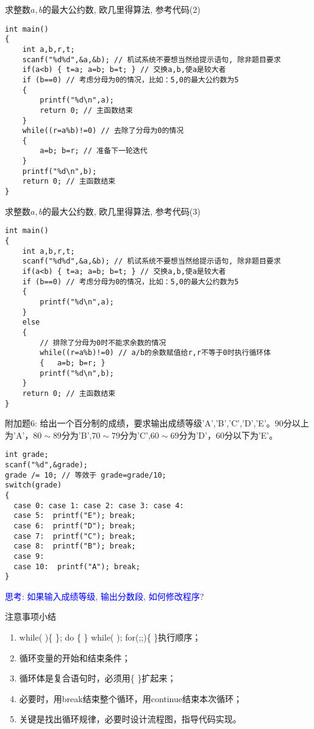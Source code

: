 \begin{frame}{求整数$a,b$的最大公约数, 欧几里得算法, 参考代码(2)}
\begin{lstlisting}
int main()
{
	int a,b,r,t;
	scanf("%d%d",&a,&b); // 机试系统不要想当然给提示语句, 除非题目要求
	if(a<b) { t=a; a=b; b=t; } // 交换a,b,使a是较大者
	if (b==0) // 考虑分母为0的情况，比如：5,0的最大公约数为5 
	{
		printf("%d\n",a);
		return 0; // 主函数结束
	}
	while((r=a%b)!=0) // 去除了分母为0的情况
	{
		a=b; b=r; // 准备下一轮迭代   
	}
	printf("%d\n",b);
	return 0; // 主函数结束
}	
\end{lstlisting}
\end{frame}

\begin{frame}{求整数$a,b$的最大公约数, 欧几里得算法, 参考代码(3)}
\begin{lstlisting}
int main()
{
	int a,b,r,t;
	scanf("%d%d",&a,&b); // 机试系统不要想当然给提示语句, 除非题目要求
	if(a<b) { t=a; a=b; b=t; } // 交换a,b,使a是较大者
	if (b==0) // 考虑分母为0的情况，比如：5,0的最大公约数为5 
	{
		printf("%d\n",a);
	}
	else
	{
		// 排除了分母为0时不能求余数的情况 
		while((r=a%b)!=0) // a/b的余数赋值给r,r不等于0时执行循环体
		{	a=b; b=r; }
		printf("%d\n",b);
	}
	return 0; // 主函数结束
}	
\end{lstlisting}
\end{frame}

\begin{frame}
附加题6: 给出一个百分制的成绩，要求输出成绩等级'A','B','C','D','E'。90分以上为'A'，$80\sim 89$分为'B',$70\sim 79$分为'C',$60\sim 69$分为'D'，60分以下为'E'。
\begin{lstlisting}
int grade;
scanf("%d",&grade);
grade /= 10; // 等效于 grade=grade/10;
switch(grade)
{
  case 0: case 1: case 2: case 3: case 4: 
  case 5:  printf("E"); break;
  case 6:  printf("D"); break;
  case 7:  printf("C"); break;
  case 8:  printf("B"); break;
  case 9:
  case 10:  printf("A"); break;
}
\end{lstlisting}
\pause
\textcolor{blue}{思考: 如果输入成绩等级, 输出分数段, 如何修改程序? }
\end{frame}

\begin{frame}{注意事项小结}
\begin{enumerate}
\setlength{\itemsep}{.5cm}
\item while( )\{ \}; do \{ \} while( ); for(;;)\{ \}执行顺序；
\item 循环变量的开始和结束条件；
\item 循环体是复合语句时，必须用\{ \}扩起来；
\item 必要时，用break结束整个循环，用continue结束本次循环；
\item 关键是找出循环规律，必要时设计流程图，指导代码实现。	
\end{enumerate}
\end{frame}